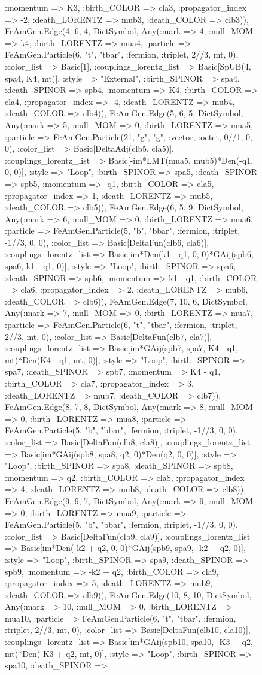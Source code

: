\documentclass{revtex4}
\begin{document}
\begin{figure}[!htb]
\begin{center}
{:momentum => K3, :birth_COLOR => cla3, :propagator_index => -2, :death_LORENTZ => mub3, :death_COLOR => clb3)), FeAmGen.Edge(4, 6, 4, Dict{Symbol, Any}(:mark => 4, :null_MOM => k4, :birth_LORENTZ => mua4, :particle => FeAmGen.Particle(6, "t", "tbar", :fermion, :triplet, 2//3, mt, 0), :color_list => Basic[1], :couplings_lorentz_list => Basic[SpUB(4, spa4, K4, mt)], :style => "External", :birth_SPINOR => spa4, :death_SPINOR => spb4, :momentum => K4, :birth_COLOR => cla4, :propagator_index => -4, :death_LORENTZ => mub4, :death_COLOR => clb4)), FeAmGen.Edge(5, 6, 5, Dict{Symbol, Any}(:mark => 5, :null_MOM => 0, :birth_LORENTZ => mua5, :particle => FeAmGen.Particle(21, "g", "g", :vector, :octet, 0//1, 0, 0), :color_list => Basic[DeltaAdj(clb5, cla5)], :couplings_lorentz_list => Basic[-im*LMT(mua5, mub5)*Den(-q1, 0, 0)], :style => "Loop", :birth_SPINOR => spa5, :death_SPINOR => spb5, :momentum => -q1, :birth_COLOR => cla5, :propagator_index => 1, :death_LORENTZ => mub5, :death_COLOR => clb5)), FeAmGen.Edge(6, 5, 9, Dict{Symbol, Any}(:mark => 6, :null_MOM => 0, :birth_LORENTZ => mua6, :particle => FeAmGen.Particle(5, "b", "bbar", :fermion, :triplet, -1//3, 0, 0), :color_list => Basic[DeltaFun(clb6, cla6)], :couplings_lorentz_list => Basic[im*Den(k1 - q1, 0, 0)*GAij(spb6, spa6, k1 - q1, 0)], :style => "Loop", :birth_SPINOR => spa6, :death_SPINOR => spb6, :momentum => k1 - q1, :birth_COLOR => cla6, :propagator_index => 2, :death_LORENTZ => mub6, :death_COLOR => clb6)), FeAmGen.Edge(7, 10, 6, Dict{Symbol, Any}(:mark => 7, :null_MOM => 0, :birth_LORENTZ => mua7, :particle => FeAmGen.Particle(6, "t", "tbar", :fermion, :triplet, 2//3, mt, 0), :color_list => Basic[DeltaFun(clb7, cla7)], :couplings_lorentz_list => Basic[im*GAij(spb7, spa7, K4 - q1, mt)*Den(K4 - q1, mt, 0)], :style => "Loop", :birth_SPINOR => spa7, :death_SPINOR => spb7, :momentum => K4 - q1, :birth_COLOR => cla7, :propagator_index => 3, :death_LORENTZ => mub7, :death_COLOR => clb7)), FeAmGen.Edge(8, 7, 8, Dict{Symbol, Any}(:mark => 8, :null_MOM => 0, :birth_LORENTZ => mua8, :particle => FeAmGen.Particle(5, "b", "bbar", :fermion, :triplet, -1//3, 0, 0), :color_list => Basic[DeltaFun(clb8, cla8)], :couplings_lorentz_list => Basic[im*GAij(spb8, spa8, q2, 0)*Den(q2, 0, 0)], :style => "Loop", :birth_SPINOR => spa8, :death_SPINOR => spb8, :momentum => q2, :birth_COLOR => cla8, :propagator_index => 4, :death_LORENTZ => mub8, :death_COLOR => clb8)), FeAmGen.Edge(9, 9, 7, Dict{Symbol, Any}(:mark => 9, :null_MOM => 0, :birth_LORENTZ => mua9, :particle => FeAmGen.Particle(5, "b", "bbar", :fermion, :triplet, -1//3, 0, 0), :color_list => Basic[DeltaFun(clb9, cla9)], :couplings_lorentz_list => Basic[im*Den(-k2 + q2, 0, 0)*GAij(spb9, spa9, -k2 + q2, 0)], :style => "Loop", :birth_SPINOR => spa9, :death_SPINOR => spb9, :momentum => -k2 + q2, :birth_COLOR => cla9, :propagator_index => 5, :death_LORENTZ => mub9, :death_COLOR => clb9)), FeAmGen.Edge(10, 8, 10, Dict{Symbol, Any}(:mark => 10, :null_MOM => 0, :birth_LORENTZ => mua10, :particle => FeAmGen.Particle(6, "t", "tbar", :fermion, :triplet, 2//3, mt, 0), :color_list => Basic[DeltaFun(clb10, cla10)], :couplings_lorentz_list => Basic[im*GAij(spb10, spa10, -K3 + q2, mt)*Den(-K3 + q2, mt, 0)], :style => "Loop", :birth_SPINOR => spa10, :death_SPINOR => }
\end{center}
\end{figure}
\end{document}
